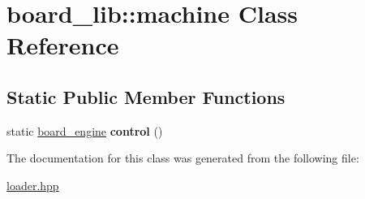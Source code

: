 \hypertarget{classboard__lib_1_1machine}{}\section{board\+\_\+lib\+:\+:machine Class Reference}
\label{classboard__lib_1_1machine}
\subsection*{Static Public Member Functions}
\begin{DoxyCompactItemize}
\item 
static \hyperlink{classboard__engine}{board\+\_\+engine} {\bfseries control} ()\hypertarget{classboard__lib_1_1machine_a365b116ffc2e9759fe0e3e76dd00a6e0}{}\label{classboard__lib_1_1machine_a365b116ffc2e9759fe0e3e76dd00a6e0}

\end{DoxyCompactItemize}


The documentation for this class was generated from the following file\+:\begin{DoxyCompactItemize}
\item 
\hyperlink{loader_8hpp}{loader.\+hpp}\end{DoxyCompactItemize}
